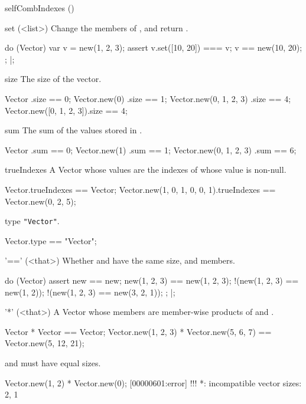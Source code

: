 \begin{urbiscriptapi}
\item[selfCombIndexes]()%

\item[set](<list>)%
  Change the members of \this, and return \this.
\begin{urbiscript}
do (Vector)
{
  var v = new(1, 2, 3);
  assert
  {
    v.set([10, 20]) === v;
    v == new(10, 20);
  };
}|;
\end{urbiscript}

\item[size]%
  The size of the vector.
\begin{urbiassert}
Vector                  .size == 0;
Vector.new(0)           .size == 1;
Vector.new(0, 1, 2, 3)  .size == 4;
Vector.new([0, 1, 2, 3]).size == 4;
\end{urbiassert}

\item[sum]%
  The sum of the values stored in \this.
\begin{urbiassert}
Vector                  .sum == 0;
Vector.new(1)           .sum == 1;
Vector.new(0, 1, 2, 3)  .sum == 6;
\end{urbiassert}

\item[trueIndexes]%
  A Vector whose values are the indexes of \this whose value is non-null.
\begin{urbiassert}
Vector.trueIndexes == Vector;
Vector.new(1, 0, 1, 0, 0, 1).trueIndexes == Vector.new(0, 2, 5);
\end{urbiassert}

\item[type]%
  \lstinline|"Vector"|.
\begin{urbiassert}
Vector.type == "Vector";
\end{urbiassert}

\item['=='](<that>)%
  Whether \this and \that have the same size, and members.
\begin{urbiscript}
do (Vector)
{
  assert
  {
               new == new;
      new(1, 2, 3) == new(1, 2, 3);
    !(new(1, 2, 3) == new(1, 2));
    !(new(1, 2, 3) == new(3, 2, 1));
  };
}|;
\end{urbiscript}

\item['*'](<that>)%
  A Vector whose members are member-wise products of \this and \that.
\begin{urbiassert}
Vector              * Vector              == Vector;
Vector.new(1, 2, 3) * Vector.new(5, 6, 7) == Vector.new(5, 12, 21);
\end{urbiassert}
  \this and \that must have equal sizes.
\begin{urbiscript}
Vector.new(1, 2) * Vector.new(0);
[00000601:error] !!! *: incompatible vector sizes: 2, 1
\end{urbiscript}


\end{urbiscriptapi}

